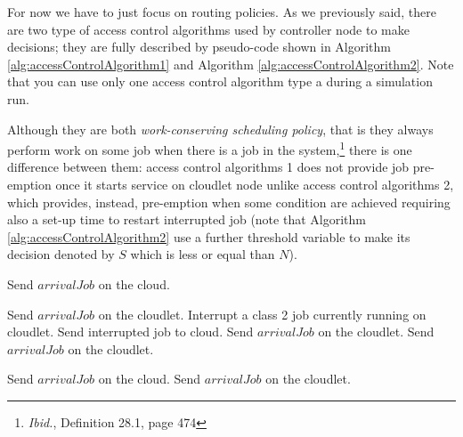 \documentclass[10pt,a4paper]{article}
\begin{document}
For now we have to just focus on routing policies. As we previously said, there are two type of access control algorithms used by controller node to make decisions; they are fully described by pseudo-code shown in Algorithm \ref{alg:accessControlAlgorithm1} and Algorithm \ref{alg:accessControlAlgorithm2}. Note that you can use only one access control algorithm type a during a simulation run.

Although they are both \textit{work-conserving scheduling policy}, that is they always perform work on some job when there is a job in the system,\footnote{\textit{Ibid.}, Definition 28.1, page 474} there is one difference between them: access control algorithms 1 does not provide job pre-emption once it starts service on cloudlet node unlike access control algorithms 2, which provides, instead, pre-emption when some condition are achieved requiring also a set-up time to restart interrupted job (note that Algorithm \ref{alg:accessControlAlgorithm2} use a further threshold variable to make its decision denoted by $S$ which is less or equal than $N$).


\begin{algorithm}[h]
\caption{}\label{alg:accessControlAlgorithm2}
\begin{algorithmic}[h!]




	\State Send $\textit{arrivalJob}$ on the cloud.

	\State Send $\textit{arrivalJob}$ on the cloudlet.
	\State Interrupt a class 2 job currently running on cloudlet.
	\State Send interrupted job to cloud.
	\State Send $\textit{arrivalJob}$ on the cloudlet.
\Else 	
 	\State Send $\textit{arrivalJob}$ on the cloudlet.
\EndIf



\Else 

	\State Send $\textit{arrivalJob}$ on the cloud.
\Else 	
 	\State Send $\textit{arrivalJob}$ on the cloudlet.
\EndIf

\EndIf

\EndFunction

\end{algorithmic}
\end{algorithm}
\end{document}

